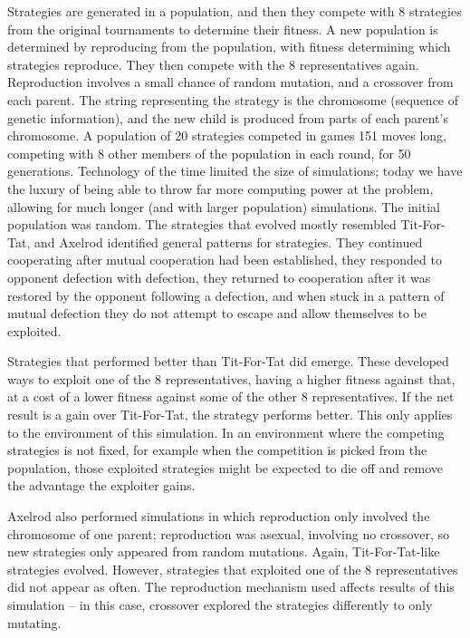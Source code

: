 \documentclass[a4paper,11pt,bcshonoursthesis,singlespace,oneside,thesisdraft,pdflatex]{cssethesis}
\begin{document}
Strategies are generated in a population, and then they compete with 8 strategies from the original tournaments to determine their fitness. A new population is determined by reproducing from the population, with fitness determining which strategies reproduce. They then compete with the 8 representatives again. 
Reproduction involves a small chance of random mutation, and a crossover from each parent. 
The string representing the strategy is the chromosome (sequence of genetic information), and the new child is produced from parts of each parent's chromosome. A population of 20 strategies competed in games 151 moves long, competing with 8 other members of the population in each round, for 50 generations. 
Technology of the time limited the size of simulations; today we have the luxury of being able to throw far more computing power at the problem, allowing for much longer (and with larger population) simulations. 
The initial population was random. The strategies that evolved mostly resembled Tit-For-Tat, and Axelrod identified general patterns for strategies. They continued cooperating after mutual cooperation had been established, they responded to opponent defection with defection, they returned to cooperation after it was restored by the opponent following a defection, and when stuck in a pattern of mutual defection they do not attempt to escape and allow themselves to be exploited. 

Strategies that performed better than Tit-For-Tat did emerge. These developed ways to exploit one of the 8 representatives, having a higher fitness against that, at a cost of a lower fitness against some of the other 8 representatives. If the net result is a gain over Tit-For-Tat, the strategy performs better. 
This only applies to the environment of this simulation. 
In an environment where the competing strategies is not fixed, for example when the competition is picked from the population, those exploited strategies might be expected to die off and remove the advantage the exploiter gains. 

Axelrod also performed simulations in which reproduction only involved the chromosome of one parent; reproduction was asexual, involving no crossover, so new strategies only appeared from random mutations. 
Again, Tit-For-Tat-like strategies evolved. However, strategies that exploited one of the 8 representatives did not appear as often. The reproduction mechanism used affects results of this simulation -- in this case, crossover explored the strategies differently to only mutating. 
\end{document}

